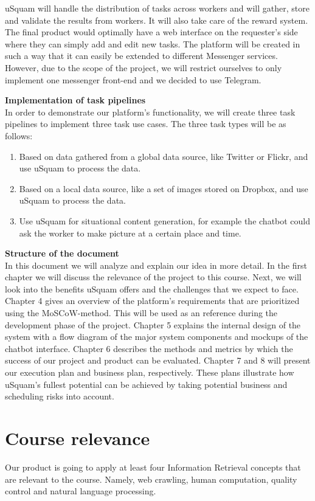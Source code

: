 \documentclass[a4paper,dutch,fleqn]{exam}
\begin{document}
uSquam will handle the distribution of tasks across workers and will  gather, store and validate the results from workers. It will also take care of the reward system. The final product would optimally have a web interface on the requester's side where they can simply add and edit new tasks. The platform will be created in such a way that it can easily be extended to different Messenger services. However, due to the scope of the project, we will restrict ourselves to only implement one messenger front-end and we decided to use Telegram. 

\textbf{Implementation of task pipelines}\\
In order to demonstrate our platform's functionality, we will create three task pipelines to implement three task use cases. The three task types will be as follows: 
\begin{enumerate}
\itemsep0em 
\item Based on data gathered from a global data source, like Twitter or Flickr, and use uSquam to process the data.
\item Based on a local data source, like a set of images stored on Dropbox, and use uSquam to process the data.
\item Use uSquam for situational content generation, for example the chatbot could ask the worker to make picture at a certain place and time.
\end{enumerate}

\textbf{Structure of the document}\\
In this document we will analyze and explain our idea in more detail. In the first chapter we will discuss the relevance of the project to this course. Next, we will look into the benefits uSquam offers and the challenges that we expect to face. Chapter 4 gives an overview of the platform's requirements that are prioritized using the MoSCoW-method. This will be used as an reference during the development phase of the project. Chapter 5 explains the internal design of the system with a flow diagram of the major system components and mockups of the chatbot interface. Chapter 6 describes the methods and metrics by which the success of our project and product can be evaluated. Chapter 7 and 8 will present our execution plan and business plan, respectively. These plans illustrate how uSquam's fullest potential can be achieved by taking potential business and scheduling risks into account.

\newpage

\section{Course relevance}
Our product is going to apply at least four Information Retrieval concepts that are relevant to the course. Namely, web crawling, human computation, quality control and natural language processing.
\end{document}
